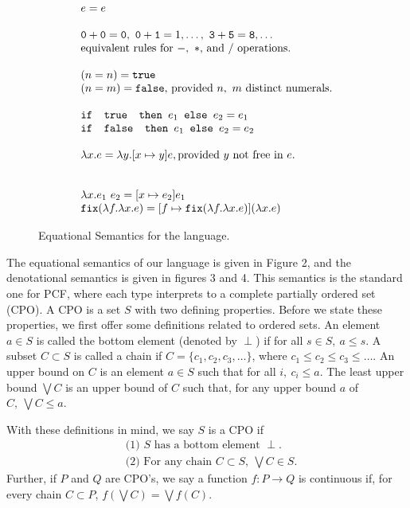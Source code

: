\begin{figure}
\[
\begin{array}{lr}
e = e \\ \\
\texttt{0} + \texttt{0} = \texttt{0}, \ \texttt{0} + \texttt{1} = 1, \ldots, \ \texttt{3} + \texttt{5} = \texttt{8}, \ldots  \\
\text{equivalent rules for } -, \ * \text{, and } /\text{ operations.}
\\ \\
(n =n) = \texttt{true} \\ (n=m) = \texttt{false}\text{, provided } n, \ m \text{ distinct numerals.}\\ \\ 
\ifelse{\texttt{ true }}{e_1}{e_2} = e_1 \\
\ifelse{\texttt{ false }}{e_1}{e_2} = e_2 \\ \\ 
\lambda x.e = \lambda y.[x \mapsto y]e, \text{provided } y \text{ not free in } e. \\ \\ \\
\lambda x.e_1 \ e_2 = [x \mapsto e_2]e_1 \\
\texttt{fix}(\lambda f. \lambda x.e) = [f \mapsto \texttt{fix}(\lambda f.\lambda x.e)](\lambda x.e)
\end{array}
\]
\caption{Equational Semantics for the language.}
\label{fig:typing}
\end{figure}

The equational semantics of our language is given in Figure 2, and the denotational semantics is given in figures 3 and 4.
This semantics is the standard one for PCF, where each type interprets to a complete
partially ordered set (CPO). A CPO is a set $S$ with two defining properties. Before we state these properties,
we first offer some definitions related to ordered sets. An element $a \in S$ is called the bottom element (denoted by $\perp$) if for all $s \in S, \ a \leq s$. A subset $C \subset S$ is called a chain if $C = \{c_1, c_2, c_3, \dots\}$, where 
$c_1 \leq c_2 \leq c_3 \leq \dots$. An upper bound on $C$ is an element $a \in S$ such that for all $i, \ c_i \leq a$. 
The least upper bound $\bigvee C$ is an upper bound of $C$ such that, for any upper bound $a$ of $C, \ \bigvee C \leq a$.

With these definitions in mind, we say $S$ is a CPO if
\begin{align*}
&\text{(1) $S$ has a bottom element }\perp.\\
&\text{(2) For any chain }C \subset S, \ \bigvee C \in S. 
\end{align*}
Further, if $P$ and $Q$ are CPO's, we say a function $f: P \rightarrow Q$ is continuous if, for every chain $C \subset P$, 
$f(\bigvee C) = \bigvee f(C)$.

